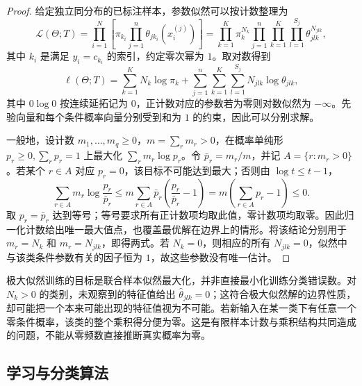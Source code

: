 \begin{proof}
给定独立同分布的已标注样本，参数似然可以按计数整理为
\begin{equation}
\label{eq:lihang-nb-likelihood}
    \mathcal{L}(\Theta;T)
    =\prod_{i=1}^{N}\left[\pi_{k_i}\prod_{j=1}^{n}\theta_{jk_i}(x_i^{(j)})\right]
    =\prod_{k=1}^{K}\pi_k^{N_k}
      \prod_{j=1}^{n}\prod_{k=1}^{K}\prod_{l=1}^{S_j}\theta_{jlk}^{N_{jlk}},
\end{equation}
其中 $k_i$ 是满足 $y_i=c_{k_i}$ 的索引，约定零次幂为 $1$。取对数得到
\[
    \ell(\Theta;T)=\sum_{k=1}^{K}N_k\log\pi_k
    +\sum_{j=1}^{n}\sum_{k=1}^{K}\sum_{l=1}^{S_j}N_{jlk}\log\theta_{jlk},
\]
其中 $0\log0$ 按连续延拓记为 $0$，正计数对应的参数若为零则对数似然为 $-\infty$。先验向量和每个条件概率向量分别受到和为 $1$ 的约束，因此可以分别求解。

一般地，设计数 $m_1,\ldots,m_q\geq0$，$m=\sum_r m_r>0$，在概率单纯形 $p_r\geq0,\sum_r p_r=1$ 上最大化 $\sum_r m_r\log p_r$。令 $\bar p_r=m_r/m$，并记 $A=\{r:m_r>0\}$。若某个 $r\in A$ 对应 $p_r=0$，该目标不可能达到最大；否则由 $\log t\leq t-1$，
\[
    \sum_{r\in A}m_r\log\frac{p_r}{\bar p_r}
    \leq m\sum_{r\in A}\bar p_r\!\left(\frac{p_r}{\bar p_r}-1\right)
    =m\left(\sum_{r\in A}p_r-1\right)\leq0.
\]
取 $p_r=\bar p_r$ 达到等号；等号要求所有正计数项均取此值，零计数项均取零。因此归一化计数给出唯一最大值点，也覆盖最优解在边界上的情形。将该结论分别用于 $m_r=N_k$ 和 $m_r=N_{jlk}$，即得两式。若 $N_k=0$，则相应的所有 $N_{jlk}=0$，似然中与该类条件参数有关的因子恒为 $1$，故这些参数没有唯一估计。
\end{proof}

极大似然训练的目标是联合样本似然最大化，并非直接最小化训练分类错误数。对 $N_k>0$ 的类别，未观察到的特征值给出 $\widehat\theta_{jlk}=0$；这符合极大似然解的边界性质，却可能把一个本来可能出现的特征值视为不可能。若新输入在某一类下有任意一个零条件概率，该类的整个乘积得分便为零。这是有限样本计数与乘积结构共同造成的问题，不能从零频数直接推断真实概率为零。

\subsection{学习与分类算法}
\label{subsec:lihang-nb-algorithm}

